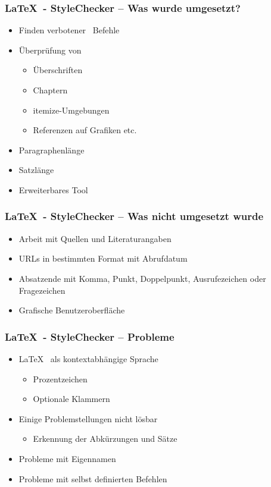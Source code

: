 \begin{frame}
\frametitle{\LaTeX~- StyleChecker -- Was wurde umgesetzt?}
\begin{block}{\vspace*{-3ex}}
	\begin{itemize}
	 	\item Finden \glqq verbotener\grqq~ Befehle
		\item Überprüfung von
		\begin{itemize}
			\item Überschriften
			\item Chaptern
			\item itemize-Umgebungen
			\item Referenzen auf Grafiken etc.
		\end{itemize}
		\item Paragraphenlänge
		\item Satzlänge
		\item Erweiterbares Tool
	\end{itemize}
\end{block}
\end{frame}
\begin{frame}
\frametitle{\LaTeX~- StyleChecker -- Was nicht umgesetzt wurde}
\begin{block}{\vspace*{-3ex}}
	\begin{itemize}
	 	\item Arbeit mit Quellen und Literaturangaben
		\item URLs in bestimmten Format mit Abrufdatum
		\item Absatzende mit Komma, Punkt, Doppelpunkt, Ausrufezeichen oder Fragezeichen
		\item Grafische Benutzeroberfläche
	\end{itemize}
\end{block}
\end{frame}
\begin{frame}
\frametitle{\LaTeX~- StyleChecker -- Probleme}
\begin{block}{\vspace*{-3ex}}
	\begin{itemize}
	  \item \LaTeX~ als kontextabhängige Sprache
	  \begin{itemize}
		\item Prozentzeichen
		\item Optionale Klammern
	  \end{itemize}
	  \item Einige Problemstellungen nicht lösbar
	  \begin{itemize}
	  	\item Erkennung der Abkürzungen und Sätze
	  \end{itemize}
	\item Probleme mit Eigennamen
	\item Probleme mit selbst definierten Befehlen
	\end{itemize}
\end{block}
\end{frame}
